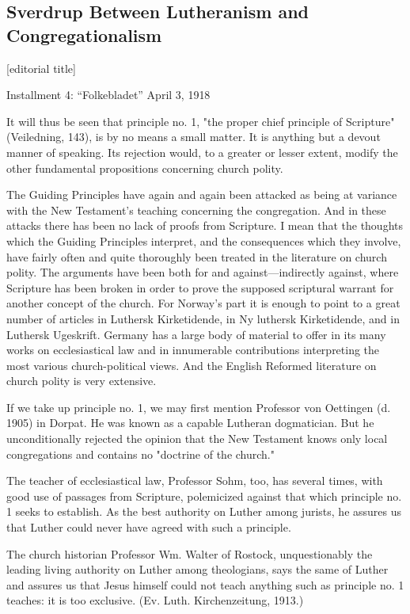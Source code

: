

\subsection{Sverdrup Between Lutheranism and Congregationalism} 

[editorial title]

Installment 4: “Folkebladet” April 3, 1918

It will thus be seen that principle no. 1, "the proper chief principle of Scripture" (Veiledning, 143), is by no means a small matter. It is anything but a devout manner of speaking. Its rejection would, to a greater or lesser extent, modify the other fundamental propositions concerning church polity.

The Guiding Principles have again and again been attacked as being at variance with the New Testament’s teaching concerning the congregation. And in these attacks there has been no lack of proofs from Scripture. I mean that the thoughts which the Guiding Principles interpret, and the consequences which they involve, have fairly often and quite thoroughly been treated in the literature on church polity. The arguments have been both for and against—indirectly against, where Scripture has been broken in order to prove the supposed scriptural warrant for another concept of the church. For Norway’s part it is enough to point to a great number of articles in Luthersk Kirketidende, in Ny luthersk Kirketidende, and in Luthersk Ugeskrift. Germany has a large body of material to offer in its many works on ecclesiastical law and in innumerable contributions interpreting the most various church-political views. And the English Reformed literature on church polity is very extensive.

If we take up principle no. 1, we may first mention Professor von Oettingen (d. 1905) in Dorpat. He was known as a capable Lutheran dogmatician. But he unconditionally rejected the opinion that the New Testament knows only local congregations and contains no "doctrine of the church."

The teacher of ecclesiastical law, Professor Sohm, too, has several times, with good use of passages from Scripture, polemicized against that which principle no. 1 seeks to establish. As the best authority on Luther among jurists, he assures us that Luther could never have agreed with such a principle.

The church historian Professor Wm. Walter of Rostock, unquestionably the leading living authority on Luther among theologians, says the same of Luther and assures us that Jesus himself could not teach anything such as principle no. 1 teaches: it is too exclusive. (Ev. Luth. Kirchenzeitung, 1913.)

